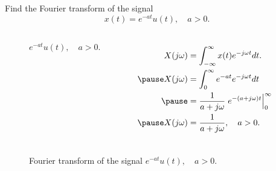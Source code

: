 \begin{frame}
    \begin{example}
        Find the Fourier transform of the signal
        \begin{equation*}
            x(t) = e^{-at}u(t), \quad a> 0.
        \end{equation*}
    \end{example}
    \pause
    {    
        \begin{columns}
                {
                    \begin{figure}
                      \centering
                      
                      \caption{$e^{-at}u(t), \quad a> 0$.}\label{fi:eatut_signal}
                    \end{figure}
                }
                \begin{equation*}
                    \begin{aligned}
                        X(j\omega) &= \int_{-\infty}^{\infty}x(t)e^{-j\omega t} dt.\\ \pause
                        X(j\omega) &= \int_{0}^{\infty} e^{-at}e^{-j\omega t}dt\\ \pause
                        &= \frac{1}{a+j\omega}\left. e^{-(a+j\omega)t}\right|_{0}^{\infty}\\ \pause
                        X(j\omega) &= \frac{1}{a+j\omega}, \quad a>0.
                    \end{aligned}
                \end{equation*}
        \end{columns}
    }
\end{frame}

\begin{frame}[plain]
    {
        \begin{figure}
          \centering
          
          \caption{Fourier transform of the signal $e^{-at}u(t), \quad a> 0$.}\label{fi:eatut}
        \end{figure}
    }
\end{frame}

